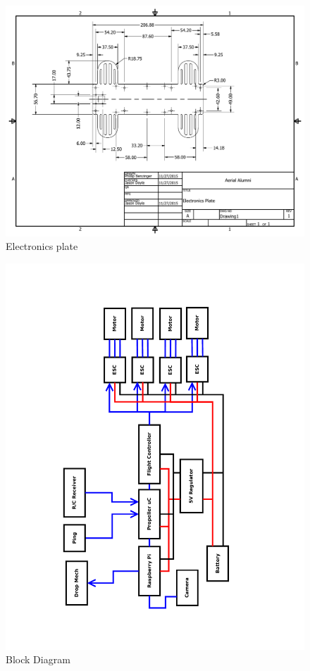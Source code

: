 \documentclass{article}
\begin{document}
\begin{figure}[h!]
\caption{Electronics plate}
\includegraphics[scale=0.65, angle=90]{CAD.pdf}
\end{figure}

\begin{figure}[h]
\caption{Block Diagram}
\includegraphics[width=\textwidth]{Block_Diagam_v2.pdf}
\end{figure}
\end{document}

